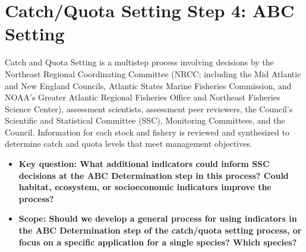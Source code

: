 \documentclass[
]{article}
\author{}
\date{\vspace{-2.5em}}
\providecommand{\tightlist}{%
  \setlength{\itemsep}{0pt}\setlength{\parskip}{0pt}}
\begin{document}
\vspace{-1cm}

\section{Catch/Quota Setting Step 4: ABC
Setting}\label{catchquota-setting-step-4-abc-setting}

\begin{noteblock}
Catch and Quota Setting is a multistep process involving decisions by
the Northeast Regional Coordinating Committee (NRCC; including the Mid
Atlantic and New England Councils, Atlantic States Marine Fisheries
Commission, and NOAA's Greater Atlantic Regional Fisheries Office and
Northeast Fisheries Science Center), assessment scientists, assessment
peer reviewers, the Council's Scientific and Statistical Committee
(SSC), Monitoring Committees, and the Council. Information for each
stock and fishery is reviewed and synthesized to determine catch and
quota levels that meet management objectives.

\end{noteblock}

\begin{itemize}
\tightlist
\item
  \textbf{Key question: What additional indicators could inform SSC
  decisions at the ABC Determination step in this process? Could
  habitat, ecosystem, or socioeconomic indicators improve the process?}
\item
  \textbf{Scope: Should we develop a general process for using
  indicators in the ABC Determination step of the catch/quota setting
  process, or focus on a specific application for a single species?
  Which species?}
\end{itemize}
\end{document}

